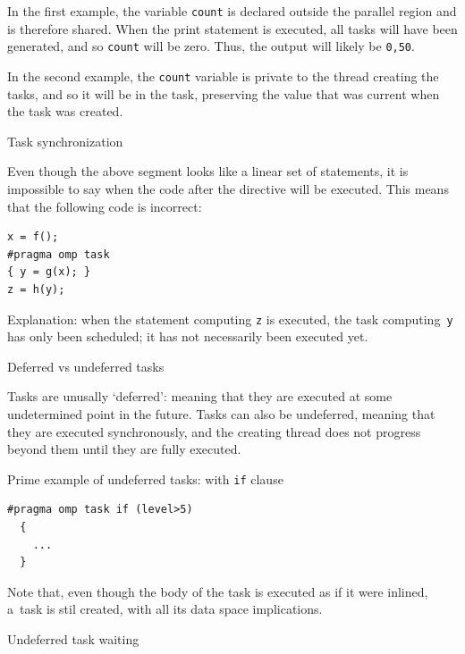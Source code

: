 In the first example,
the variable \lstinline{count} is declared outside the
parallel region and is therefore shared. When the print statement is
executed, all tasks will have been generated, and so \lstinline{count} will be
zero. Thus, the output will likely be \lstinline{0,50}.

In the second example,
the \lstinline{count} variable is private to the thread creating the tasks,
and so it will be  in the task, preserving the value
that was current when the task was created.


 {Task synchronization}

Even though the above segment looks like a linear set of statements,
it is impossible to say when
the code after the  directive will be executed.
This means that the following code is incorrect:
\begin{lstlisting}[language=omp]
x = f();
#pragma omp task
{ y = g(x); }
z = h(y);  
\end{lstlisting}
Explanation: when the statement computing \lstinline{z} is executed, the task
computing~\lstinline{y} has only been scheduled;
it has not necessarily been executed yet.

 {Deferred vs undeferred tasks}

Tasks are unusally `deferred': meaning that they are executed
at some undetermined point in the future.
Tasks can also be undeferred, meaning that they are executed
synchronously, and the creating thread does not progress beyond them
until they are fully executed.

Prime example of undeferred tasks: with \lstinline[language=omp]{if} clause
\begin{lstlisting}[language=omp]
#pragma omp task if (level>5)
  {
    ...
  }
\end{lstlisting}
Note that, even though the body of the task is executed as if it were inlined,
a~task is stil created, with all its data space implications.

 {Undeferred task waiting}

